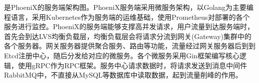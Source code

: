 是PhoeniX的服务端架构图。PhoeniX服务端采用微服务架构，以Golang为主要编程语言，采用Kubernetes作为服务端的运维基础，使用Prometheus对部署的各个服务进行监控。PhoeniX的服务端能够支撑高并发请求，用户流量到达服务端时，首先会到达LVS均衡负载层，均衡负载层会将请求分流到网关(Gateway)集群中的各个服务器。网关服务器提供聚合服务、路由等功能，流量经过网关服务器后到到Etcd注册中心，随后分发给对应的微服务。各个微服务采用Gin框架编写核心逻辑，使用gRPC作为RPC框架。服务中心请求数据时，将请求发送到消息中间件RabbitMQ中，不直接从MySQL等数据库中读取数据，起到流量削峰的作用。